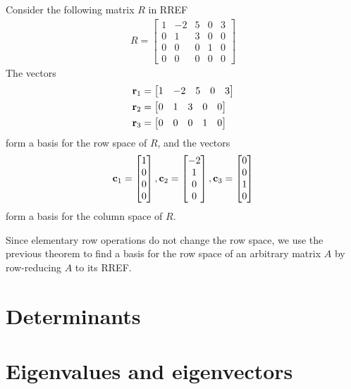 \documentclass[12pt,letterpaper,reqno]{article}
\numberwithin{equation}{section}
\newcommand{\fixme}[1]{{\color{orange}{[#1]}}}
\begin{document}
\begin{pf}
\fixme{Add proof.}	
\end{pf}


\begin{example}
Consider the following matrix $R$ in RREF
\begin{align*}
	R=\begin{bmatrix}
		1&-2&5&0&3\\0&1&3&0&0\\
		0&0&0&1&0\\0&0&0&0&0
	\end{bmatrix}
\end{align*}	
The vectors 
\begin{align*}
	{\bf r}_1&=\begin{bmatrix}
		1&-2&5&0&3
	\end{bmatrix} \\
	{\bf r}_2&=\begin{bmatrix}
		0&1&3&0&0
	\end{bmatrix} \\
	{\bf r}_3&=\begin{bmatrix}
		0&0&0&1&0
	\end{bmatrix} \\	
\end{align*}
form a basis for the row space of $R$, and the vectors 
\begin{align*}
	{\bf c}_1=\begin{bmatrix}
		1\\0\\0\\0
	\end{bmatrix}, {\bf c}_2=\begin{bmatrix}
		-2\\1\\0\\0
	\end{bmatrix}, {\bf c}_3=\begin{bmatrix}
		0\\0\\1\\0
	\end{bmatrix}
\end{align*}
form a basis for the column space of $R$.
\end{example}

Since elementary row operations do not change the row space, we use the previous theorem to find a basis for the row space of an arbitrary matrix $A$ by row-reducing $A$ to its RREF.
	
\section{Determinants}

\section{Eigenvalues and eigenvectors}

\printbibliography
\nocite{*}
\end{document}

